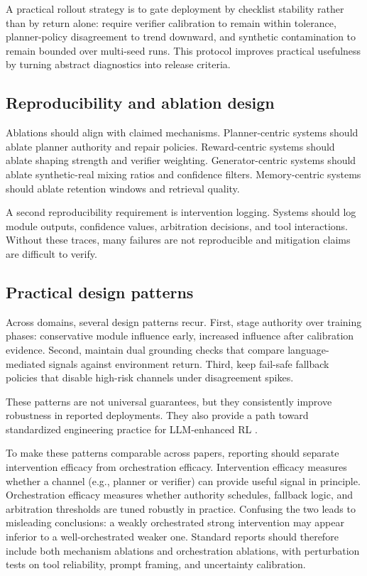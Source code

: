 \documentclass[pdflatex,sn-mathphys-num]{sn-jnl}
\begin{document}
A practical rollout strategy is to gate deployment by checklist stability rather than by return alone: require verifier calibration to remain within tolerance, planner-policy disagreement to trend downward, and synthetic contamination to remain bounded over multi-seed runs. This protocol improves practical usefulness by turning abstract diagnostics into release criteria.

\subsection{Reproducibility and ablation design}
Ablations should align with claimed mechanisms. Planner-centric systems should ablate planner authority and repair policies. Reward-centric systems should ablate shaping strength and verifier weighting. Generator-centric systems should ablate synthetic-real mixing ratios and confidence filters. Memory-centric systems should ablate retention windows and retrieval quality.

A second reproducibility requirement is intervention logging. Systems should log module outputs, confidence values, arbitration decisions, and tool interactions. Without these traces, many failures are not reproducible and mitigation claims are difficult to verify.

\subsection{Practical design patterns}
Across domains, several design patterns recur. First, stage authority over training phases: conservative module influence early, increased influence after calibration evidence. Second, maintain dual grounding checks that compare language-mediated signals against environment return. Third, keep fail-safe fallback policies that disable high-risk channels under disagreement spikes.

These patterns are not universal guarantees, but they consistently improve robustness in reported deployments. They also provide a path toward standardized engineering practice for LLM-enhanced RL \cite{arxiv_p_2204_01691,arxiv_p_2404_03648,arxiv_p_2602_06493,arxiv_p_2602_02454,arxiv_p_2512_05686}.

To make these patterns comparable across papers, reporting should separate intervention efficacy from orchestration efficacy. Intervention efficacy measures whether a channel (e.g., planner or verifier) can provide useful signal in principle. Orchestration efficacy measures whether authority schedules, fallback logic, and arbitration thresholds are tuned robustly in practice. Confusing the two leads to misleading conclusions: a weakly orchestrated strong intervention may appear inferior to a well-orchestrated weaker one. Standard reports should therefore include both mechanism ablations and orchestration ablations, with perturbation tests on tool reliability, prompt framing, and uncertainty calibration.
\end{document}
